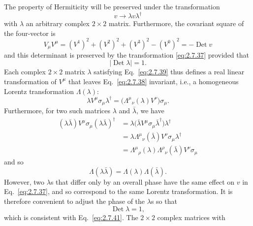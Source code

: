 The property of Hermiticity will be preserved under the transformation
\begin{equation}
  v\longrightarrow\lambda v\lambda^\dagger
  \tag{2.7.37}\label{eq:2.7.37}
\end{equation}
with $\lambda$ an arbitrary complex $2\times2$ matrix. Furthermore, the
covariant square of the four-vector is
\begin{equation}
  V_\mu V^\mu=(V^1)^2+(V^2)^2+(V^3)^2-(V^0)^2
    =-\operatorname{Det}v
  \tag{2.7.38}\label{eq:2.7.38}
\end{equation}
and this determinant is preserved by the transformation \eqref{eq:2.7.37} provided that
\begin{equation}
  |\operatorname{Det}\lambda|=1.
  \tag{2.7.39}\label{eq:2.7.39}
\end{equation}
Each complex $2\times2$ matrix $\lambda$ satisfying Eq.~\eqref{eq:2.7.39} thus defines a
real linear transformation of $V^\mu$ that leaves Eq.~\eqref{eq:2.7.38} invariant, i.e.,
a homogeneous Lorentz transformation $\Lambda(\lambda)$:
\begin{equation}
  \lambda V^\mu\sigma_\mu\lambda^\dagger
    =\bigl(\Lambda^\mu{}_{\nu}(\lambda)V^\nu\bigr)\sigma_\mu.
  \tag{2.7.40}\label{eq:2.7.40}
\end{equation}
Furthermore, for two such matrices $\lambda$ and $\bar\lambda$, we have
\begin{align*}
  (\lambda\bar\lambda)V^\mu\sigma_\mu
    (\lambda\bar\lambda)^\dagger
  &=\lambda\bigl(\bar\lambda V^\mu\sigma_\mu
      \bar\lambda^\dagger\bigr)\lambda^\dagger\\
  &=\lambda\Lambda^\mu{}_{\nu}(\bar\lambda)V^\nu
      \sigma_\mu\lambda^\dagger\\
  &=\Lambda^\mu{}_{\rho}(\lambda)
      \Lambda^\rho{}_{\nu}(\bar\lambda)V^\nu\sigma_\mu
\end{align*}
and so
\begin{equation}
  \Lambda(\lambda\bar\lambda)=\Lambda(\lambda)\Lambda(\bar\lambda).
  \tag{2.7.41}\label{eq:2.7.41}
\end{equation}
However, two $\lambda$s that differ only by an overall phase have the same
effect on $v$ in Eq.~\eqref{eq:2.7.37}, and so correspond to the same Lorentz
transformation. It is therefore convenient to adjust the phase of the
$\lambda$s so that
\begin{equation}
  \operatorname{Det}\lambda=1,
  \tag{2.7.42}\label{eq:2.7.42}
\end{equation}
which is consistent with Eq.~\eqref{eq:2.7.41}. The $2\times2$ complex matrices with
